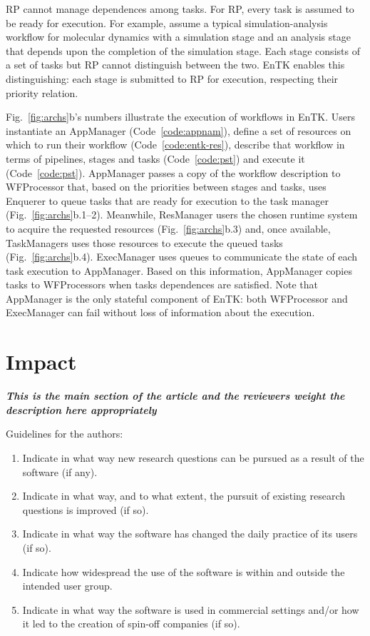 \documentclass[preprint,12pt, a4paper]{elsarticle}
\begin{document}
RP cannot manage dependences among tasks. For RP, every task is assumed to be
ready for execution. For example, assume a typical simulation-analysis
workflow for molecular dynamics with a simulation stage and an analysis stage
that depends upon the completion of the simulation stage. Each stage consists
of a set of tasks but RP cannot distinguish between the two. EnTK enables
this distinguishing: each stage is submitted to RP for execution, respecting
their priority relation.

Fig.~\ref{fig:archs}b's numbers illustrate the execution of workflows in
EnTK\@. Users instantiate an AppManager (Code~\ref{code:appnam}), define a
set of resources on which to run their workflow (Code~\ref{code:entk-res}),
describe that workflow in terms of pipelines, stages and tasks
(Code~\ref{code:pst}) and execute it (Code~\ref{code:pst}). AppManager passes
a copy of the workflow description to WFProcessor that, based on the
priorities between stages and tasks, uses Enquerer to queue tasks that are
ready for execution to the task manager (Fig.~\ref{fig:archs}b.1--2).
Meanwhile, ResManager users the chosen runtime system to acquire the
requested resources (Fig.~\ref{fig:archs}b.3) and, once available,
TaskManagers uses those resources to execute the queued tasks
(Fig.~\ref{fig:archs}b.4). ExecManager uses queues to communicate the state
of each task execution to AppManager. Based on this information, AppManager
copies tasks to WFProcessors when tasks dependences are satisfied. Note that
AppManager is the only stateful component of EnTK\@: both WFProcessor and
ExecManager can fail without loss of information about the
execution.

\section{Impact}\label{sec:impact}

{\em \textbf{This is the main section of the article and the reviewers weight
the description here appropriately}

Guidelines for the authors:
\begin{enumerate}
  \item Indicate in what way new research questions can be pursued as a
        result of the software (if any).
  \item Indicate in what way, and to what extent, the pursuit of existing
        research questions is improved (if so).
  \item Indicate in what way the software has changed the daily practice of
        its users (if so).
  \item Indicate how widespread the use of the software is within and outside
        the intended user group.
  \item Indicate in what way the software is used in commercial settings
        and/or how it led to the creation of spin-off companies (if so).
\end{enumerate}}
\end{document}
